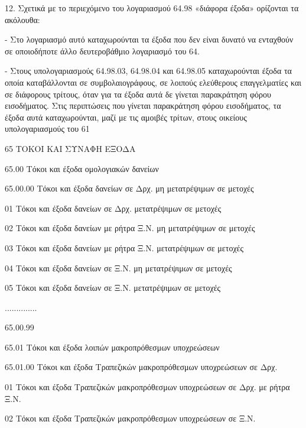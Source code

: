 \documentclass[A4,10pt,greek]{book}
\begin{document}
12. Σχετικά με το περιεχόμενο του λογαριασμού 64.98 «διάφορα έξοδα» ορίζονται τα ακόλουθα:

- Στο λογαριασμό αυτό καταχωρούνται τα έξοδα που δεν είναι δυνατό να ενταχθούν σε οποιοδήποτε άλλο δευτεροβάθμιο λογαριασμό του 64.

- Στους υπολογαριασμούς 64.98.03, 64.98.04 και 64.98.05 καταχωρούνται έξοδα τα οποία καταβάλλονται σε συμβολαιογράφους, σε λοιπούς ελεύθερους επαγγελματίες και σε διάφορους τρίτους, όταν για τα έξοδα αυτά δε γίνεται παρακράτηση φόρου εισοδήματος. Στις περιπτώσεις που γίνεται παρακράτηση φόρου εισοδήματος, τα έξοδα αυτά καταχωρούνται, μαζί με τις αμοιβές τρίτων, στους οικείους υπολογαριασμούς του 61

65   ΤΟΚΟΙ ΚΑΙ ΣΥΝΑΦΗ ΕΞΟΔΑ

        65.00   Τόκοι και έξοδα ομολογιακών δανείων

                    65.00.00   Τόκοι και έξοδα δανείων σε Δρχ. μη μετατρέψιμων σε μετοχές

                               01   Τόκοι και έξοδα δανείων σε Δρχ. μετατρέψιμων σε μετοχές

                               02   Τόκοι και έξοδα δανείων με ρήτρα Ξ.Ν. μη μετατρέψιμων
                                       σε μετοχές

                               03   Τόκοι και έξοδα δανείων με ρήτρα Ξ.Ν. μετατρέψιμων
                                       σε μετοχές

                               04   Τόκοι και έξοδα δανείων σε Ξ.Ν. μη μετατρέψιμων σε μετοχές

                               05   Τόκοι και έξοδα δανείων σε Ξ.Ν. μετατρέψιμων σε μετοχές

                     ..............

                     65.00.99

        65.01   Τόκοι και έξοδα λοιπών μακροπρόθεσμων υποχρεώσεων

                     65.01.00   Τόκοι και έξοδα Τραπεζικών μακροπρόθεσμων
                                       υποχρεώσεων σε Δρχ.

                               01   Τόκοι και έξοδα Τραπεζικών μακροπρόθεσμων
                                       υποχρεώσεων σε Δρχ. με ρήτρα Ξ.Ν.

                               02   Τόκοι και έξοδα Τραπεζικών μακροπρόθεσμων
                                       υποχρεώσεων σε Ξ.Ν.
\end{document}
